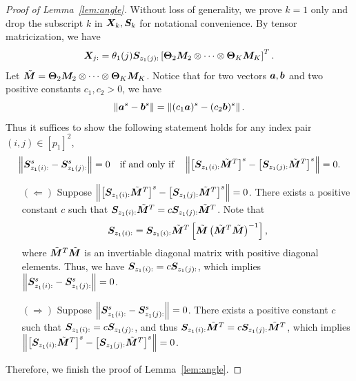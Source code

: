 \documentclass[lettersize,onecolumn,journal]{IEEEtran}
\theoremstyle{definition}
\theoremstyle{definition}
\newcommand{\of}[1]{\left(#1\right)}
\newcommand{\off}[1]{\left[#1\right]}
\begin{document}
\begin{proof}[Proof of Lemma~\ref{lem:angle}] Without loss of generality, we prove $k = 1$ only and drop the subscript $k$ in $\bm X_k, \bm S_k$ for notational convenience. 
By tensor matricization, we have
\begin{equation}
    \mX_{j:} = \theta_1(j) \mS_{z_1(j):} \off{\mTheta_2 \mM_2 \otimes \cdots \otimes \mTheta_K \mM_K}^T.
\end{equation}     
Let $\tilde {\bm M} = \boldsymbol{\Theta}_2 \bm M_2 \otimes \cdots \otimes \boldsymbol{\Theta}_K \bm M_K$. Notice that for two vectors $\bm{a}, \bm{b}$ and two positive constants $c_1, c_2 >0$, we have
\begin{equation}
\left\lVert\bm{a}^s - \bm{b}^s\right\rVert = \left\lVert(c_1 \bm{a})^s - (c_2\bm{b})^s\right\rVert.
\end{equation}
Thus it suffices to show the following statement holds for any index pair $(i,j)\in[p_1]^2$,
\begin{equation}
\onorm{ \mS_{z_1(i):}^s - \mS_{z_1(j):}^s} = 0 \quad \text{if and only if} \quad \onorm{ \off{\mS_{z_1(i):} \tilde \mM^T }^s - \off{\mS_{z_1(j):}\tilde \mM^T}^s} = 0.
\end{equation}
\begin{enumerate}[wide]
    \item[$(\Leftarrow)$] Suppose $\onorm{ \off{\mS_{z_1(i):} \tilde \mM^T }^s - \off{\mS_{z_1(j):}\tilde \mM^T}^s} = 0$. There exists a positive constant $c$ such that $\bm S_{z_1(i):} \tilde {\bm M}^T= c \bm S_{z_1(j):} \tilde {\bm M}^T$. Note that
\begin{equation}
    \mS_{z_1(i):} = \mS_{z_1(i):} \tilde \mM^T \off{ \tilde \mM \of{ \tilde \mM^T  \tilde \mM}^{-1}},
\end{equation}
where $ \tilde {\bm M}^T  \tilde {\bm M}$ is an invertiable diagonal matrix with positive diagonal elements. Thus, we have $ \bm S_{z_1(i):} = c  \bm S_{z_1(j):}$, which implies $ \left\lVert  \bm S_{z_1(i):}^s -  \bm S_{z_1(j):}^s \right\rVert = 0 $.

\item[$(\Rightarrow)$] Suppose $ \left\lVert \bm S_{z_1(i):}^s - \bm S_{z_1(j):}^s \right\rVert = 0 $. There exists a positive constant $c$ such that $\bm S_{z_1(i):} = c \bm S_{z_1(j):}$, and thus $\bm S_{z_1(i):} \tilde {\bm M}^T = c \bm S_{z_1(j):} \tilde {\bm M}^T$, which implies $\left\lVert\left[\bm S_{z_1(i):} \tilde {\bm M}^T\right]^s- \left[\bm S_{z_1(j):} \tilde {\bm M}^T\right]^s\right\rVert=0$.
\end{enumerate}
Therefore, we finish the proof of Lemma~\ref{lem:angle}.
\end{proof}
\end{document}
